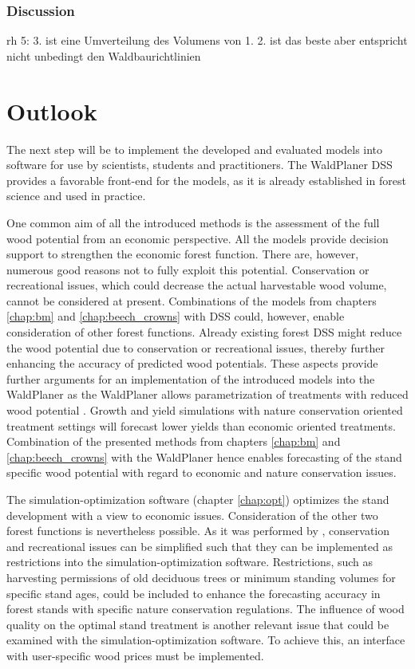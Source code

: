 \subsubsection{Discussion}
rh 5: 3. ist eine Umverteilung des Volumens von 1. 2. ist das beste aber entspricht nicht unbedingt den Waldbaurichtlinien

\section{Outlook}
\label{sec:discussion:outlook}
The next step will be to implement the developed and evaluated models into software for use by scientists, students and practitioners. The WaldPlaner DSS provides a favorable front-end for the models, as it is already established in forest science and used in practice.

One common aim of all the introduced methods is the assessment of the full wood potential from an economic perspective. All the models provide decision support to strengthen the economic forest function. There are, however, numerous good reasons not to fully exploit this potential. Conservation or recreational issues, which could decrease the actual harvestable wood volume, cannot be considered at present. Combinations of the models from chapters \ref{chap:bm} and \ref{chap:beech_crowns} with DSS could, however, enable consideration of other forest functions. Already existing forest DSS might reduce the wood potential due to conservation or recreational issues, thereby further enhancing the accuracy of predicted wood potentials. These aspects provide further arguments for an implementation of the introduced models into the WaldPlaner as the WaldPlaner allows parametrization of treatments with reduced wood potential \citep[p. 90-93]{hansen_2014}. Growth and yield simulations with nature conservation oriented treatment settings will forecast lower yields than economic oriented treatments. Combination of the presented methods from chapters \ref{chap:bm} and \ref{chap:beech_crowns} with the WaldPlaner hence enables forecasting of the stand specific wood potential with regard to economic and nature conservation issues.

The si\-mu\-la\-tion-op\-ti\-mi\-za\-tion software (chapter \ref{chap:opt}) optimizes the stand development with a view to economic issues. Consideration of the other two forest functions is nevertheless possible. As it was performed by \citet{yousefpour_2009}, conservation and recreational issues can be simplified such that they can be implemented as restrictions into the si\-mu\-la\-tion-op\-ti\-mi\-za\-tion software. Restrictions, such as harvesting permissions of old deciduous trees or minimum standing volumes for specific stand ages, could be included to enhance the forecasting accuracy in forest stands with specific nature conservation regulations. The influence of wood quality on the optimal stand treatment is another relevant issue that could be examined with the si\-mu\-la\-tion-op\-ti\-mi\-za\-tion software. To achieve this, an interface with user-specific wood prices must be implemented.

